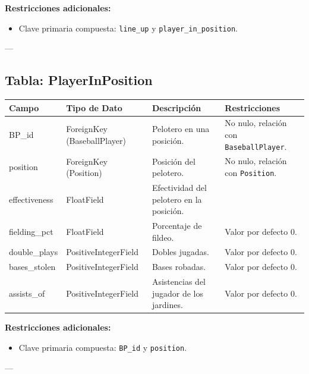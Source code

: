 \documentclass{report}
\begin{document}
    \textbf{Restricciones adicionales:}
    \begin{itemize}
        \item Clave primaria compuesta: \texttt{line\_up} y \texttt{player\_in\_position}.
    \end{itemize}
    
    ---
    
    \subsection*{Tabla: PlayerInPosition}
    \begin{tabular}{|>{\raggedright\arraybackslash}p{3cm}|>{\raggedright\arraybackslash}p{3cm}|>{\raggedright\arraybackslash}p{6cm}|>{\raggedright\arraybackslash}p{4cm}|}
        \hline
        \textbf{Campo} & \textbf{Tipo de Dato} & \textbf{Descripción} & \textbf{Restricciones} \\
        \hline
        BP\_id & ForeignKey (BaseballPlayer) & Pelotero en una posición. & No nulo, relación con \texttt{BaseballPlayer}. \\
        \hline
        position & ForeignKey (Position) & Posición del pelotero. & No nulo, relación con \texttt{Position}. \\
        \hline
        effectiveness & FloatField & Efectividad del pelotero en la posición. &  \\
        \hline
        fielding\_pct & FloatField & Porcentaje de fildeo. & Valor por defecto 0. \\
        \hline
        double\_plays & PositiveIntegerField & Dobles jugadas. & Valor por defecto 0. \\
        \hline
        bases\_stolen & PositiveIntegerField & Bases robadas. & Valor por defecto 0. \\
        \hline
        assists\_of & PositiveIntegerField & Asistencias del jugador de los jardines. & Valor por defecto 0. \\
        \hline
    \end{tabular}
    
    \textbf{Restricciones adicionales:}
    \begin{itemize}
        \item Clave primaria compuesta: \texttt{BP\_id} y \texttt{position}.
    \end{itemize}
    
    ---
    
\end{document}
